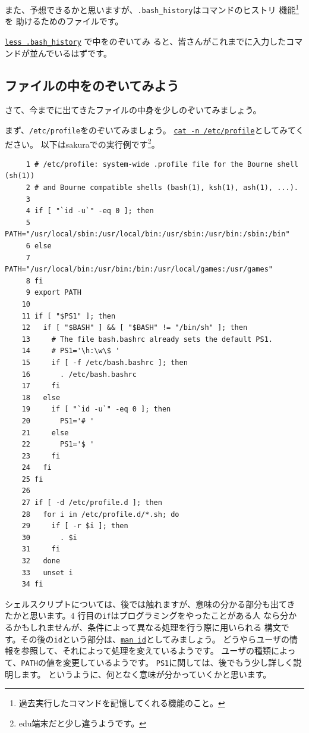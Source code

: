 \documentclass[a4j]{ltjreport}
\begin{document}
    また、予想できるかと思いますが、\verb+.bash_history+はコマンドのヒストリ
    機能\footnote{過去実行したコマンドを記憶してくれる機能のこと。}を
    助けるためのファイルです。
    
    \underline{\texttt{less .bash\_history}} で中をのぞいてみ
    ると、皆さんがこれまでに入力したコマンドが並んでいるはずです。

    \subsection{ファイルの中をのぞいてみよう}
    さて、今までに出てきたファイルの中身を少しのぞいてみましょう。

    まず、\verb+/etc/profile+をのぞいてみましょう。
    \underline{\texttt{cat -n /etc/profile}}としてみてください。
    以下はsakuraでの実行例です\footnote{edu端末だと少し違うようです。}。

    \begin{verbatim}  
     1 # /etc/profile: system-wide .profile file for the Bourne shell (sh(1))
     2 # and Bourne compatible shells (bash(1), ksh(1), ash(1), ...).
     3 
     4 if [ "`id -u`" -eq 0 ]; then
     5   PATH="/usr/local/sbin:/usr/local/bin:/usr/sbin:/usr/bin:/sbin:/bin"
     6 else
     7   PATH="/usr/local/bin:/usr/bin:/bin:/usr/local/games:/usr/games"
     8 fi
     9 export PATH
    10 
    11 if [ "$PS1" ]; then
    12   if [ "$BASH" ] && [ "$BASH" != "/bin/sh" ]; then
    13     # The file bash.bashrc already sets the default PS1.
    14     # PS1='\h:\w\$ '
    15     if [ -f /etc/bash.bashrc ]; then
    16       . /etc/bash.bashrc
    17     fi
    18   else
    19     if [ "`id -u`" -eq 0 ]; then
    20       PS1='# '
    21     else
    22       PS1='$ '
    23     fi
    24   fi
    25 fi
    26 
    27 if [ -d /etc/profile.d ]; then
    28   for i in /etc/profile.d/*.sh; do
    29     if [ -r $i ]; then
    30       . $i
    31     fi
    32   done
    33   unset i
    34 fi
    \end{verbatim}

    シェルスクリプトについては、後では触れますが、意味の分かる部分も出てき
    たかと思います。4 行目の\verb+if+はプログラミングをやったことがある人
    なら分かるかもしれませんが、条件によって異なる処理を行う際に用いられる
    構文です。その後の\verb+id+という部分は、\underline{\texttt{man id}}としてみましょう。
    どうやらユーザの情報を参照して、それによって処理を変えているようです。
    ユーザの種類によって、\verb+PATH+の値を変更しているようです。
    \verb+PS1+に関しては、後でもう少し詳しく説明します。
    というように、何となく意味が分かっていくかと思います。
    
\end{document}
